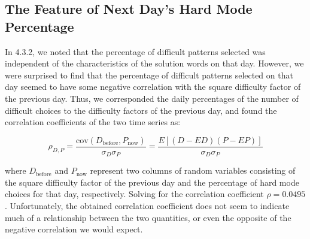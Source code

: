 \documentclass[12pt]{mcmthesis}
\begin{document}
\subsection{The Feature of Next Day's Hard Mode Percentage}
\hspace{1.4em} In 4.3.2, we noted that the percentage of difficult patterns selected was independent of the characteristics of the solution words on that day. However, we were surprised to find that the percentage of difficult patterns selected on that day seemed to have some negative correlation with the square difficulty factor of the previous day. Thus, we corresponded the daily percentages of the number of difficult choices to the difficulty factors of the previous day, and found the correlation coefficients of the two time series as:

\begin{equation}\label{eq:15}
\rho _{D,P}=\frac{\text{cov}\left( D_{\text{before}},P_{\text{now}} \right)}{\sigma _D\sigma _P}=\frac{E\left[ \left( D-ED \right) \left( P-EP \right) \right]}{\sigma _D\sigma _P}
\end{equation}

where $ D_{\text{before}} $ and $ P_{\text{now}} $ represent two columns of random variables consisting of the square difficulty factor of the previous day and the percentage of hard mode choices for that day, respectively. Solving for the correlation coefficient $ \rho= 0.0495$. Unfortunately, the obtained correlation coefficient does not seem to indicate much of a relationship between the two quantities, or even the opposite of the negative correlation we would expect.
\end{document}
